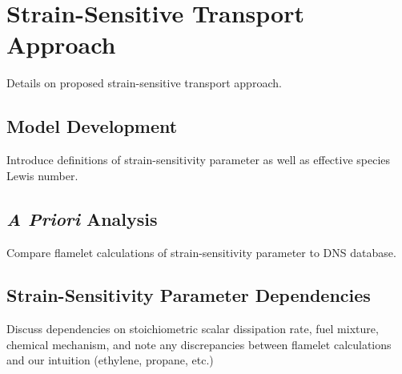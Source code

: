 \section{Strain-Sensitive Transport Approach}
\label{sec:transport:ssta}

Details on proposed strain-sensitive transport approach.


\subsection{Model Development}
\label{sec:transport:ssta:framework}

Introduce definitions of strain-sensitivity parameter as well as effective species Lewis number.


\subsection{\textit{A Priori} Analysis}
\label{sec:transport:ssta:dns}

Compare flamelet calculations of strain-sensitivity parameter to DNS database.


\subsection{Strain-Sensitivity Parameter Dependencies}
\label{sec:transport:ssta:dependencies}

Discuss dependencies on stoichiometric scalar dissipation rate, fuel mixture, chemical mechanism, and note any discrepancies between flamelet calculations and our intuition (ethylene, propane, etc.)
